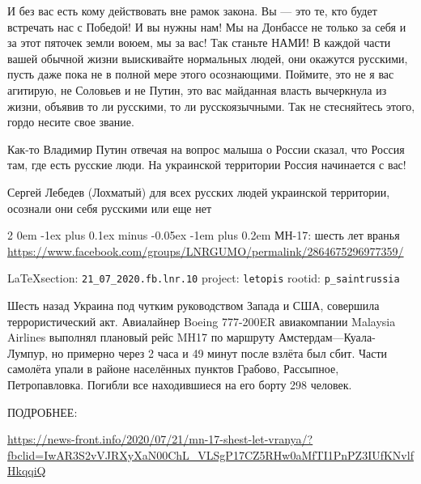 \documentclass[a4paper,11pt]{extreport}
\makeatletter
\renewcommand\subsection{%
  \clearpage
    \@startsection{subsection}%
    {2}%
    {0em}%
    {-1ex plus 0.1ex minus -0.05ex}%
    {-1em plus 0.2em}%
    {\scshape\bfseries\Large}%
}
\makeatother
\begin{document}
И без вас есть кому действовать вне рамок закона. Вы --- это те, кто будет
встречать нас с Победой! И вы нужны нам! Мы на Донбассе не только за себя и за
этот пяточек земли воюем, мы за вас! Так станьте НАМИ! В каждой части вашей
обычной жизни выискивайте нормальных людей, они окажутся русскими, пусть даже
пока не в полной мере этого осознающими. Поймите, это не я вас агитирую, не
Соловьев и не Путин, это вас майданная власть вычеркнула из жизни, объявив то
ли русскими, то ли русскоязычными. Так не стесняйтесь этого, гордо несите свое
звание.

Как-то Владимир Путин отвечая на вопрос малыша о России сказал, что Россия там,
где есть русские люди. На украинской территории Россия начинается с вас!

Сергей Лебедев (Лохматый) для всех русских людей украинской территории,
осознали они себя русскими или еще нет
  
 
 
\subsection{МН-17: шесть лет вранья}
\label{sec:21_07_2020.fb.lnr.10}
\url{https://www.facebook.com/groups/LNRGUMO/permalink/2864675296977359/}
  
\vspace{0.5cm}
{\small\LaTeX section: \verb|21_07_2020.fb.lnr.10| project: \verb|letopis| rootid: \verb|p_saintrussia|}
\vspace{0.5cm}

 
Шесть назад Украина под чутким руководством Запада и США, совершила террористический акт.
Авиалайнер Boeing 777-200ER авиакомпании Malaysia Airlines выполнял плановый рейс MH17 по маршруту Амстердам—Куала-Лумпур, но примерно через 2 часа и 49 минут после взлёта был сбит.
Части самолёта упали в районе населённых пунктов Грабово, Рассыпное, Петропавловка.
Погибли все находившиеся на его борту 298 человек.

ПОДРОБНЕЕ:

\url{https://news-front.info/2020/07/21/mn-17-shest-let-vranya/?fbclid=IwAR3S2vVJRXyXaN00ChL_VLSgP17CZ5RHw0aMfTI1PnPZ3IUfKNvlfHkqqiQ}
 
\end{document}

